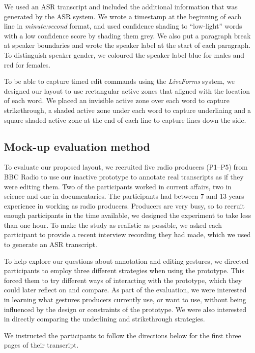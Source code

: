We used an ASR transcript and included the additional information that was generated by the ASR system.  We wrote a
timestamp at the beginning of each line in \textit{minute:second} format, and used confidence shading \citep{Vemuri2004}
to ``low-light'' words with a low confidence score by shading them grey. We also put a paragraph break at speaker
boundaries and wrote the speaker label at the start of each paragraph. To distinguish speaker gender, we coloured the
speaker label blue for males and red for females.

To be able to capture timed edit commands using the \textit{Live\texttrademark Forms} system, we designed our layout to
use rectangular active zones that aligned with the location of each word.
We placed an invisible active zone over each word to capture strikethrough, a shaded active zone under each word to
capture underlining and a square shaded active zone at the end of each line to capture lines down the side.

\subsection{Mock-up evaluation method}

To evaluate our proposed layout, we recruited five radio producers (P1--P5) from BBC Radio to use our inactive
prototype to annotate real transcripts as if they were editing them.  Two of the participants worked in current
affairs, two in science and one in documentaries.  The participants had between 7 and 13 years experience in working as
radio producers.  Producers are very busy, so to recruit enough participants in the time available, we designed the
experiment to take less than one hour.  To make the study as realistic as possible, we asked each participant to
provide a recent interview recording they had made, which we used to generate an ASR transcript.

To help explore our questions about annotation and editing gestures, we directed participants to employ three different
strategies when using the prototype. This forced them to try different ways of interacting with the prototype, which
they could later reflect on and compare.  As part of the evaluation, we were interested in learning what gestures
producers currently use, or want to use, without being influenced by the design or constraints of the prototype.
We were also interested in directly comparing the underlining and strikethrough strategies.

We instructed the participants to follow the directions below for the first three pages of their transcript.





